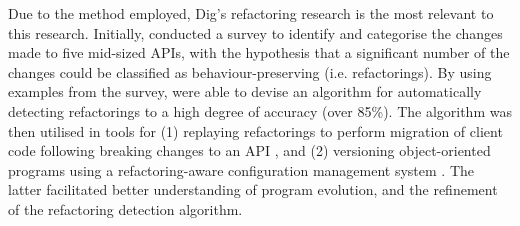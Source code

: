 Due to the method employed, Dig's refactoring research is the most relevant to this research. Initially, \cite{dig06apis} conducted a survey to identify and categorise the changes made to five mid-sized APIs, with the hypothesis that a significant number of the changes could be classified as behaviour-preserving (i.e. refactorings). By using examples from the survey, \cite{dig06detection} were able to devise an algorithm for automatically detecting refactorings to a high degree of accuracy (over 85\%). The algorithm was then utilised in tools for (1) replaying refactorings to perform migration of client code following breaking changes to an API \cite{dig06automatic}, and (2) versioning object-oriented programs using a refactoring-aware configuration management system \cite{dig07cms}. The latter facilitated better understanding of program evolution, and the refinement of the refactoring detection algorithm.
